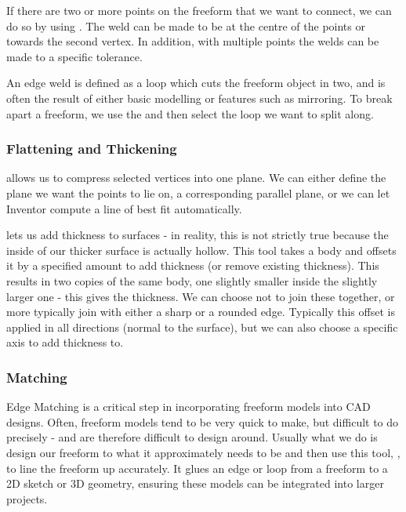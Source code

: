 If there are two or more points on the freeform that we want to connect, we can do so by using . The weld can be made to be at the centre of the points or towards the second vertex. In addition, with multiple points the welds can be made to a specific tolerance. 

An edge weld is defined as a loop which cuts the freeform object in two, and is often the result of either basic modelling or features such as mirroring. To break apart a freeform, we use the  and then select the loop we want to split along. 


\subsubsection{Flattening and Thickening}

 allows us to compress selected vertices into one plane. We can either define the plane we want the points to lie on, a corresponding parallel plane, or we can let Inventor compute a line of best fit automatically.

 lets us add thickness to surfaces - in reality, this is not strictly true because the inside of our thicker surface is actually hollow. This tool takes a body and offsets it by a specified amount to add thickness (or remove existing thickness). This results in two copies of the same body, one slightly smaller inside the slightly larger one - this gives the thickness. We can choose not to join these together, or more typically join with either a sharp or a rounded edge. Typically this offset is applied in all directions (normal to the surface), but we can also choose a specific axis to add thickness to.

\subsubsection{Matching}
\mediumdifficulty

Edge Matching is a critical step in incorporating freeform models into CAD designs. Often, freeform models tend to be very quick to make, but difficult to do precisely - and are therefore difficult to design around. Usually what we do is design our freeform to what it approximately needs to be and then use this tool, , to line the freeform up accurately. It glues an edge or loop from a freeform to a 2D sketch or 3D geometry, ensuring these models can be integrated into larger projects. 

